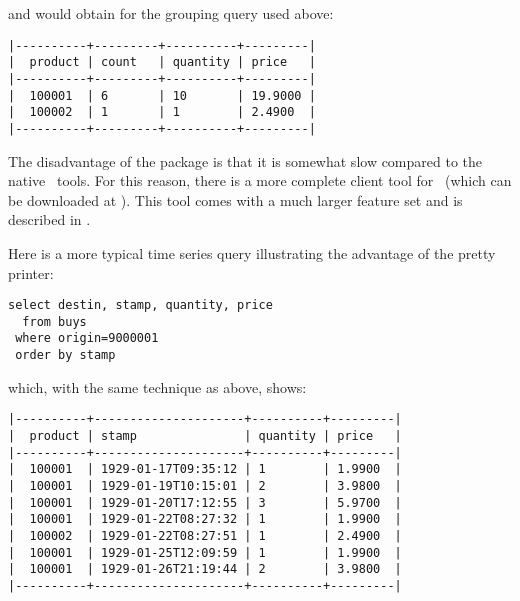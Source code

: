 
and would obtain for the grouping query used above:

\begin{minipage}{\textwidth}
\begin{verbatim}
|----------+---------+----------+---------|
|  product | count   | quantity | price   |
|----------+---------+----------+---------|
|  100001  | 6       | 10       | 19.9000 |
|  100002  | 1       | 1        | 2.4900  |
|----------+---------+----------+---------|
\end{verbatim}
\end{minipage}

The disadvantage of the  package is that
it is somewhat slow compared to the native \nowdb\ tools.
For this reason, there is a more complete client tool
for \nowdb\ (which can be downloaded at ).
This tool comes with a much larger feature set
and is described in .

Here is a more typical time series query illustrating
the advantage of the pretty printer:

\begin{sqlcode}
\begin{lstlisting}
select destin, stamp, quantity, price
  from buys
 where origin=9000001 
 order by stamp
\end{lstlisting}
\end{sqlcode}

\begin{minipage}{\textwidth}
which, with the same technique as above, shows:
\begin{verbatim}
|----------+---------------------+----------+---------|
|  product | stamp               | quantity | price   |
|----------+---------------------+----------+---------|
|  100001  | 1929-01-17T09:35:12 | 1        | 1.9900  |
|  100001  | 1929-01-19T10:15:01 | 2        | 3.9800  |
|  100001  | 1929-01-20T17:12:55 | 3        | 5.9700  |
|  100001  | 1929-01-22T08:27:32 | 1        | 1.9900  |
|  100002  | 1929-01-22T08:27:51 | 1        | 2.4900  |
|  100001  | 1929-01-25T12:09:59 | 1        | 1.9900  |
|  100001  | 1929-01-26T21:19:44 | 2        | 3.9800  |
|----------+---------------------+----------+---------|
\end{verbatim}
\end{minipage}

